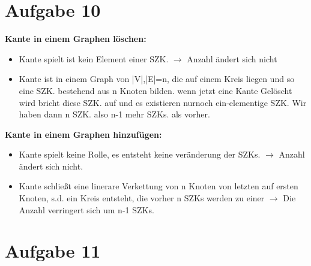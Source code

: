 \documentclass[10pt,a4paper]{article}
\begin{document}
\section*{Aufgabe 10}


    \textbf{Kante in einem Graphen löschen:}
    \begin{itemize}
    
    \item Kante spielt ist kein Element einer SZK. $\rightarrow$ Anzahl ändert sich nicht
    \item Kante ist in einem Graph von |V|,|E|=n, die auf einem Kreis liegen und so eine SZK. bestehend aus n Knoten bilden. wenn jetzt eine Kante Gelöscht wird bricht diese SZK. auf und es existieren nurnoch ein-elementige SZK. Wir haben dann n SZK. also n-1 mehr SZKs. als vorher.
    \end{itemize}
    
    \textbf{Kante in einem Graphen hinzufügen:}
    
    \begin{itemize}
    
    \item Kante spielt keine Rolle, es entsteht keine veränderung der SZKs. $\rightarrow$ Anzahl ändert sich nicht.
    \item Kante schließt eine linerare Verkettung von n Knoten von letzten auf ersten Knoten, s.d. ein Kreis entsteht, die vorher n SZKs werden zu einer $\rightarrow$ Die Anzahl verringert sich um n-1 SZKs.
        
    \end{itemize}

\section*{Aufgabe 11}
\end{document}
